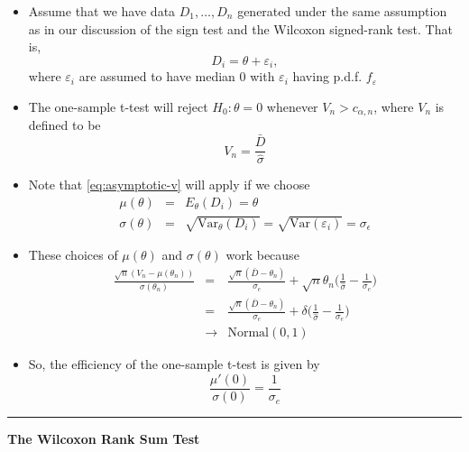 \documentclass[]{book}
\begin{document}
\begin{itemize}
\item
  Assume that we have data \(D_{1}, \ldots, D_{n}\) generated under the same assumption
  as in our discussion of the sign test and the Wilcoxon signed-rank test. That is,
  \begin{equation}
  D_{i} = \theta + \varepsilon_{i},
  \end{equation}
  where \(\varepsilon_{i}\) are assumed to have median \(0\) with \(\varepsilon_{i}\) having p.d.f. \(f_{\varepsilon}\)
\item
  The one-sample t-test will reject \(H_{0}: \theta = 0\) whenever
  \(V_{n} > c_{\alpha, n}\), where \(V_{n}\) is defined to be
  \begin{equation}
  V_{n} = \frac{\bar{D}}{ \hat{\sigma} }
  \end{equation}
\item
  Note that \eqref{eq:asymptotic-v} will apply if we choose
  \begin{eqnarray}
  \mu(\theta) &=& E_{\theta}(D_{i}) = \theta \nonumber \\
  \sigma(\theta) &=& \sqrt{\textrm{Var}_{\theta}(D_{i})} = \sqrt{\textrm{Var}(\varepsilon_{i})} = \sigma_{\epsilon}
  \end{eqnarray}
\item
  These choices of \(\mu(\theta)\) and \(\sigma(\theta)\) work because
  \begin{eqnarray}
  \frac{\sqrt{n}(V_{n} - \mu(\theta_{n}))}{\sigma(\theta_{n})}
  &=& \frac{\sqrt{n}(\bar{D} - \theta_{n})}{\sigma_{e}} + \sqrt{n}\theta_{n}\Big( \frac{1}{\hat{\sigma}} - \frac{1}{\sigma_{e}}  \Big) \nonumber \\
  &=& \frac{\sqrt{n}(\bar{D} - \theta_{n})}{\sigma_{e}} + \delta\Big( \frac{1}{\hat{\sigma}} - \frac{1}{\sigma_{e}}  \Big)  \nonumber \\
  &\longrightarrow& \textrm{Normal}(0, 1)
  \end{eqnarray}
\item
  So, the efficiency of the one-sample t-test is given by
  \begin{equation}
  \frac{\mu'(0)}{\sigma(0)} = \frac{1}{ \sigma_{e} }  \nonumber 
  \end{equation}
\end{itemize}

\begin{center}\rule{0.5\linewidth}{\linethickness}\end{center}

\textbf{The Wilcoxon Rank Sum Test}
\end{document}
